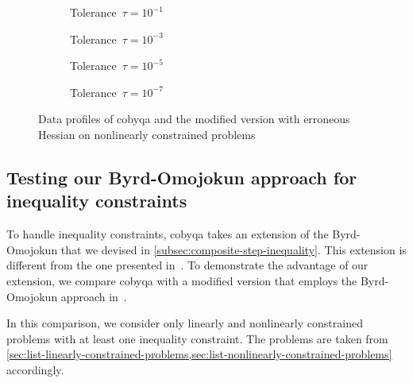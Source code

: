 \begin{figure}[ht]
    \centering
    \begin{subfigure}[b]{0.49\textwidth}
        \centering
        \caption{Tolerance~$\tau = 10^{-1}$}
    \end{subfigure}
    \hfill
    \begin{subfigure}[b]{0.49\textwidth}
        \centering
        \caption{Tolerance~$\tau = 10^{-3}$}
    \end{subfigure}
    \begin{subfigure}[b]{0.49\textwidth}
        \centering
        \caption{Tolerance~$\tau = 10^{-5}$}
    \end{subfigure}
    \hfill
    \begin{subfigure}[b]{0.49\textwidth}
        \centering
        \caption{Tolerance~$\tau = 10^{-7}$}
    \end{subfigure}
    \caption[Data profiles with erroneous Hessian]{Data profiles of \gls{cobyqa} and the modified version with erroneous Hessian on nonlinearly constrained problems}
    \label{fig:data-wrong-hessian}
\end{figure}

\subsection{Testing our Byrd-Omojokun approach for inequality constraints}
\label{subsec:perf-byrd-omojokun}

To handle inequality constraints, \gls{cobyqa} takes an extension of the Byrd-Omojokun that we devised in \cref{subsec:composite-step-inequality}.
This extension is different from the one presented in~\cite[\S~15.4.4]{Conn_Gould_Toint_2000}.
To demonstrate the advantage of our extension, we compare \gls{cobyqa} with a modified version that employs the Byrd-Omojokun approach in~\cite[\S~15.4.4]{Conn_Gould_Toint_2000}.

In this comparison, we consider only linearly and nonlinearly constrained problems with at least one inequality constraint.
The problems are taken from \cref{sec:list-linearly-constrained-problems,sec:list-nonlinearly-constrained-problems} accordingly.


